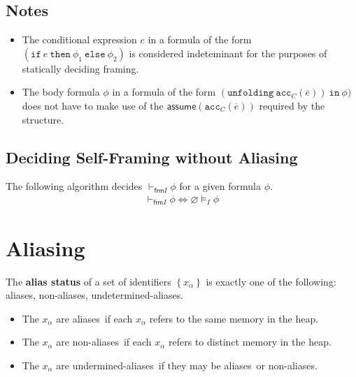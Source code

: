 \documentclass{article}
\newcommand{\tsf}{\textsf}
\newcommand{\tbf}{\textbf}
\newcommand{\ttt}{\texttt}
\newcommand{\assume}{\tsf{assume}}
\newcommand{\frames}{\vDash_I}
\newcommand{\selfframes}{\vdash_{\tsf{frm}I}}
\newcommand{\set}[1]{\left\{ #1 \right\}}
\renewcommand{\vec}{\overline}
\renewcommand{\empty}{\varnothing}
\newcommand{\cif}{\ttt{if}}
\newcommand{\cthen}{\ttt{then}}
\newcommand{\celse}{\ttt{else}}
\newcommand{\cacc}{\ttt{acc}}
\newcommand{\cunfolding}{\ttt{unfolding}}
\newcommand{\cin}{\ttt{in}}
\newcommand{\aliases}{\tsf{aliases}}
\newcommand{\nonaliases}{\tsf{non-aliases}}
\newcommand{\unaliases}{\tsf{undermined-aliases}}
\begin{document}
\subsection{Notes}

\begin{itemize}
\item The conditional expression $e$ in a formula of the form $(\cif \ e \ \cthen \ \phi_1 \ \celse \ \phi_2)$ is considered indeteminant for the purposes of statically deciding framing.

\item The body formula $\phi$ in a formula of the form $(\cunfolding \ \cacc_C(\vec{e})) \ \cin \ \phi)$ does not have to make use of the $\assume(\cacc_C(\vec{e}))$ required by the structure.
\end{itemize}

\subsection{Deciding Self-Framing without Aliasing}

\noindent
The following algorithm decides $\selfframes \phi$ for a given formula $\phi$.
\begin{align*}
\selfframes \phi \iff \empty \frames \phi
\end{align*}

\newpage
\section{Aliasing}

The \tbf{alias status} of a set of identifiers $\set{ x_\alpha }$ is exactly one of the following: \aliases, \nonaliases, \tsf{undetermined-aliases}.
\begin{itemize}
\item The $x_\alpha$ are \aliases\ if each $x_\alpha$ refers to the same memory in the heap.
\item The $x_\alpha$ are \nonaliases\ if each $x_\alpha$ refers to distinct memory in the heap.
\item The $x_\alpha$ are \unaliases\ if they may be \aliases\ or \nonaliases.
\end{itemize}
\end{document}
